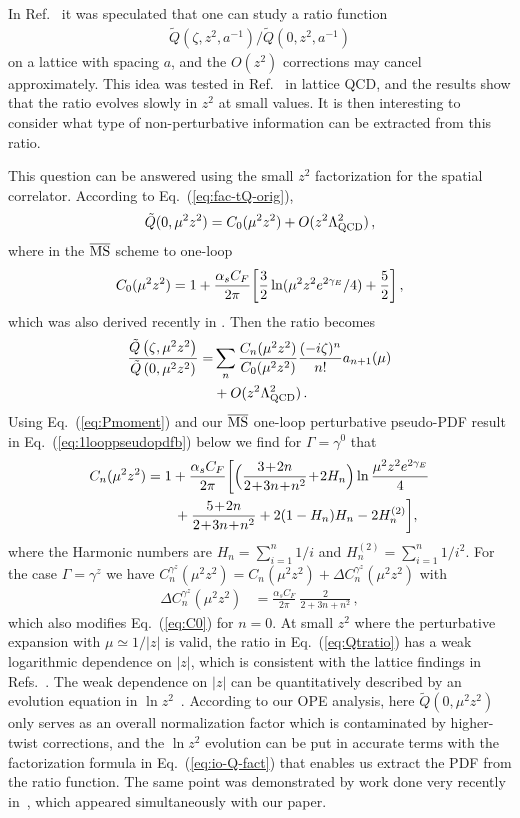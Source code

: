 \documentclass[prd,aps,twocolumn,preprintnumbers,showpacs,nofootinbib,superscriptaddress,notitlepage]{revtex4-1}
\newcommand{\beq}{\begin{eqnarray}}
\newcommand{\eeq}{\end{eqnarray}}
\newcommand{\nn}{\nonumber}
\newcommand{\spcorr}{spatial correlator\xspace}
\DeclareRobustCommand{\eq}[1]{Eq.~(\ref{eq:#1})}
\begin{document}
In Ref.~\cite{Radyushkin:2017cyf} it was speculated that one can study a ratio function
\beq \label{eq:ratio}
\tilde{Q}(\zeta,z^2,a^{-1})/\tilde{Q}(0,z^2,a^{-1})
\eeq
on a lattice with spacing $a$, and the $O(z^2)$ corrections may cancel approximately. This idea was tested in Ref.~\cite{Orginos:2017kos} in lattice QCD, and the results show that the ratio evolves slowly in $z^2$ at small values. It is then interesting to consider what type of non-perturbative information can be extracted from this ratio.

This question can be answered using the small $z^2$ factorization for the \spcorr.
 According to Eq.~(\ref{eq:fac-tQ-orig}),
\beq
	\tilde{Q}(0,\mu^2 z^2) = C_0(\mu^2z^2) + O(z^2\Lambda_{\rm QCD}^2)\,,
\eeq
where in the $\overline{\rm MS}$ scheme to one-loop
\beq  \label{eq:C0}
	C_0(\mu^2z^2) = 1 + {\alpha_sC_F\over 2\pi} \biggl[ {3\over2} \ln(\mu^2z^2 e^{2\gamma_E}/4)+{5\over2} \biggr] \,,
\eeq
which was also derived recently in \cite{Zhang:2018ggy}.
Then the ratio becomes
\begin{align} \label{eq:Qtratio}
	\frac{\tilde{Q}\left(\zeta, {\mu}^2 z^2\right)}{\tilde{Q}\left(0, {\mu}^2 z^2\right)}
	=&\sum_n \frac{C_n (\mu^2z^2)}{C_0 (\mu^2z^2)}	\frac{(-i \zeta)^n}{n!} a_{n+1}(\mu)\nn\\
	&+ O(z^2\Lambda_{\rm QCD}^2)\,.
\end{align}
Using \eq{Pmoment} and our $\overline{\rm MS}$ one-loop perturbative pseudo-PDF result in \eq{1looppseudopdfb} below we find for $\Gamma=\gamma^0$ that
\begin{align}
  C_n(\mu^2 z^2) &= 1 +\frac{\alpha_s C_F}{2\pi} \biggl[ \Bigl(
  \frac{3\!+\!2n}{2\!+\!3n\!+\!n^2}
  \!+\! 2H_n\Bigr) \ln\frac{\mu^2z^2 e^{2\gamma_E}}{4}
  \nn\\
 &\quad\quad
  +   \frac{5\!+\!2n}{2\!+\!3n\!+\!n^2}+2(1-H_n)H_n - 2 H_n^{(2)}
  \biggr] ,
\end{align}
where the Harmonic numbers are $H_n=\sum_{i=1}^n 1/i$ and $H_n^{(2)} =\sum_{i=1}^n 1/i^2$.  For the case $\Gamma=\gamma^z$ we have $C_n^{\gamma^z}(\mu^2 z^2) = C_n(\mu^2 z^2) + \Delta C_n^{\gamma^z}(\mu^2 z^2)$ with
\begin{align}
  \Delta C_n^{\gamma^z}(\mu^2 z^2)
   &= \frac{\alpha_s C_F}{2\pi} \: \frac{2}{2\!+\!3n\!+\!n^2} \,,
\end{align}
which also modifies \eq{C0} for $n=0$.
At small $z^2$ where the perturbative expansion with $\mu\simeq 1/|z|$ is valid, the ratio in \eq{Qtratio} has a weak logarithmic dependence on $|z|$, which is consistent with the lattice findings in Refs.~\cite{Orginos:2017kos,Karpie:2017bzm}. The weak dependence on $|z|$ can be quantitatively described by an evolution equation in $\ln z^2$~\cite{Radyushkin:2017cyf,Radyushkin:2017lvu}. According to our OPE analysis, here $\tilde{Q}(0,\mu^2 z^2)$ only serves as an overall normalization factor which is contaminated by higher-twist corrections, and the $\ln z^2$ evolution can be put in accurate terms with the factorization formula in Eq.~(\ref{eq:io-Q-fact}) that enables us extract the PDF from the ratio function. The same point was demonstrated by work done very recently in~\cite{Zhang:2018ggy}, which appeared simultaneously with our paper.
\end{document}
